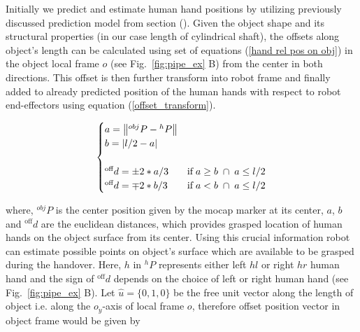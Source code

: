 Initially we predict and estimate human hand positions by utilizing previously discussed prediction model from section (). Given the object shape and its structural properties (in our case length of cylindrical shaft), the offsets along object's length can be calculated using set of equations (\ref{hand rel pos on obj}) in the object local frame $o$ (see Fig.~\ref{fig:pipe_ex} B) from the center in both directions. This offset is then further transform into robot frame and finally added to already predicted position of the human hands with respect to robot end-effectors using equation (\ref{offset_transform}).


\begin{equation}\label{hand rel pos on obj}
\centering
\begin{cases}
a = \norm{{}^{obj}{P} - {}^{h}{P}} & \text{}  \\

b = \abs{l/2 - a}  & \text{} \\
\\
{}^\text{off}{d} = \pm 2*a/3 &  \text{if} \; a \geq b \; \cap \; a\leq l/2\\

{}^\text{off}{d} = \mp 2*b/3 &  \text{if} \; a < b \; \cap \; a\leq l/2\\
\end{cases}
\end{equation}

where, ${}^{obj}{P}$ is the center position given by the mocap marker at its center, $a$, $b$ and ${}^\text{off}{d}$ are the euclidean distances, which provides grasped location of human hands on the object surface from its center. Using this crucial information robot can estimate possible points on object's surface which are available to be grasped during the handover. Here, $h$ in ${}^{h}{P}$ represents either left $hl$ or right $hr$ human hand and the sign of ${}^\text{off}{d}$ depends on the choice of left or right human hand (see Fig.~\ref{fig:pipe_ex} B). Let $\hat{u} = \{0, 1, 0\}$ be the free unit vector along the length of object i.e. along the $o_y$-axis of local frame $o$, therefore offset position vector in object frame would be given by

